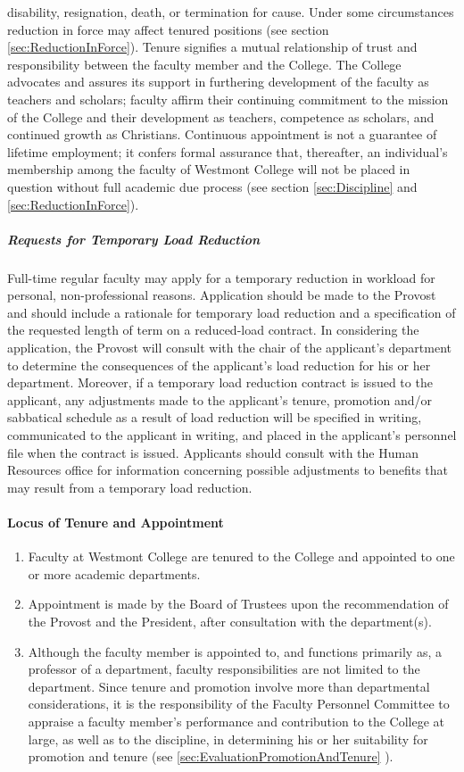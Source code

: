 					disability, resignation, death, or termination for cause.
					Under some circumstances reduction in force may affect
					tenured positions (see section \ref{sec:ReductionInForce}).  Tenure signifies a
					mutual relationship of trust and responsibility between the
					faculty member and the College.  The College advocates and
					assures its support in furthering development of the faculty
					as teachers and scholars; faculty affirm their continuing
					commitment to the mission of the College and their
					development as teachers, competence as scholars, and
					continued growth as Christians. Continuous appointment is
					not a guarantee of lifetime employment; it confers formal
					assurance that, thereafter, an individual's membership among
					the faculty of Westmont College will not be placed in
					question without full academic due process (see
					section
					\ref{sec:Discipline} and
					\ref{sec:ReductionInForce}).
				\subparagraph{Requests for Temporary Load Reduction}
					Full-time regular faculty may apply for a temporary reduction in workload for personal, non-professional reasons.  Application should be made to the Provost and should include a rationale for temporary load reduction and a specification of the requested length of term on a reduced-load contract.  In considering the application, the Provost will consult with the chair of the applicant's department to determine the consequences of the applicant's load reduction for his or her department.  Moreover, if a temporary load reduction contract is issued to the applicant, any adjustments made to the applicant's tenure, promotion and/or sabbatical schedule as a result of load reduction will be specified in writing, communicated to the applicant in writing, and placed in the applicant's personnel file when the contract is issued.  Applicants should consult with the Human Resources office for information concerning possible adjustments to benefits that may result from a temporary load reduction.
			\paragraph{Locus of Tenure and Appointment}
				\begin{enumerate}[label=\alph*)]
					\item{Faculty at Westmont College are tenured to the College and appointed to one or more academic departments.}
					\item{Appointment is made by the Board of Trustees upon the recommendation of the Provost and the President, after consultation with the department(s).}
					\item{Although the faculty member is appointed to, and functions primarily as, a professor of a department, faculty responsibilities are not limited to the department.  Since tenure and promotion involve more than departmental considerations, it is the responsibility of the Faculty Personnel Committee to appraise a faculty member's performance and contribution to the College at large, as well as to the discipline, in determining his or her suitability for promotion and tenure (see
						\ref{sec:EvaluationPromotionAndTenure}
						).}
				\end{enumerate}
